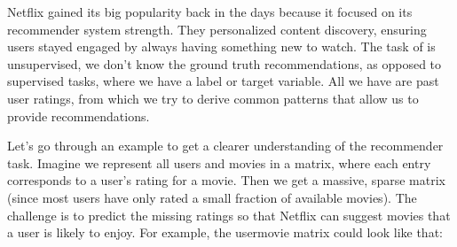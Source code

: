 \documentclass[letterpaper,10pt,english]{jupyterBook}
\begin{document}
\sphinxAtStartPar
Netflix gained its big popularity back in the days because it focused on its recommender system strength. They personalized content discovery, ensuring users stayed engaged by always having something new to watch. The task of  is unsupervised, we don’t know the ground truth recommendations, as opposed to supervised tasks, where we have a label or target variable.  All we have are past user ratings, from which we try to derive common patterns that allow us to provide recommendations.

\sphinxAtStartPar
Let’s go through an example to get a clearer understanding of the recommender task. Imagine we represent all users and movies in a matrix, where each entry corresponds to a user’s rating for a movie. Then we get a massive, sparse matrix (since most users have only rated a small fraction of available movies). The challenge is to predict the missing ratings so that Netflix can suggest movies that a user is likely to enjoy. For example, the user\sphinxhyphen{}movie matrix could look like that:
\end{document}
